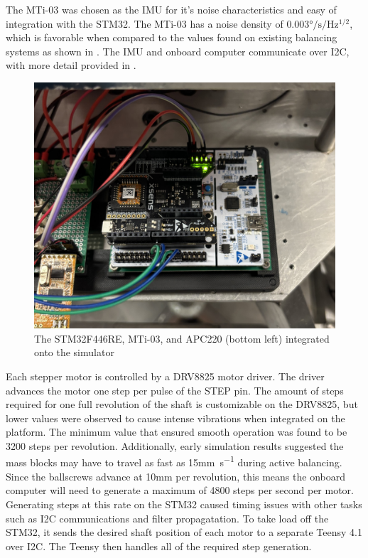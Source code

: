 The MTi-03 was chosen as the IMU for it's noise characteristics and easy of integration with the STM32. The MTi-03 has a noise density of $0.003\si{\degree\per\second\per\Hz^{1/2}}$, which is favorable when compared to the values found on existing balancing systems as shown in . The IMU and onboard computer communicate over I2C, with more detail provided in .


\begin{figure}[h]\label{fig:OBC}
    \centering
    \includegraphics[width=0.80\linewidth]{figures/OBC.jpg}
    \caption{The STM32F446RE, MTi-03, and APC220 (bottom left) integrated onto the simulator}
\end{figure}

Each stepper motor is controlled by a DRV8825 motor driver. The driver advances the motor one step per pulse of the STEP pin. The amount of steps required for one full revolution of the shaft is customizable on the DRV8825, but lower values were observed to cause intense vibrations when integrated on the platform. The minimum value that ensured smooth operation was found to be 3200 steps per revolution. Additionally, early simulation results suggested the mass blocks may have to travel as fast as 15\si{\mm\per\second} during active balancing. Since the ballscrews advance at 10\si{mm} per revolution, this means the onboard computer will need to generate a maximum of 4800 steps per second per motor. Generating steps at this rate on the STM32 caused timing issues with other tasks such as I2C communications and filter propagatation. To take load off the STM32, it sends the desired shaft position of each motor to a separate Teensy 4.1 over I2C. The Teensy then handles all of the required step generation.

